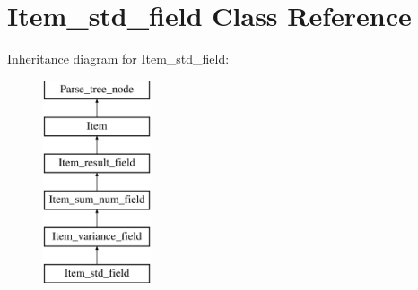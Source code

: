 \hypertarget{classItem__std__field}{}\section{Item\+\_\+std\+\_\+field Class Reference}
\label{classItem__std__field}
Inheritance diagram for Item\+\_\+std\+\_\+field\+:\begin{figure}[H]
\begin{center}
\leavevmode
\includegraphics[height=6.000000cm]{classItem__std__field}
\end{center}
\end{figure}
